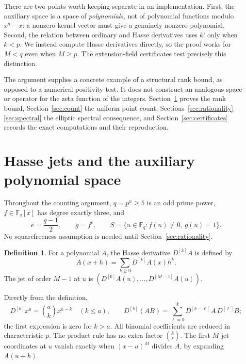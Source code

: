 \documentclass[11pt]{amsart}
\theoremstyle{definition}
\newtheorem{definition}[theorem]{Definition}
\theoremstyle{remark}
\newcommand{\F}{\mathbb F}
\newcommand{\HD}[1]{D^{[#1]}}
\begin{document}
There are two points worth keeping separate in an implementation. First, the auxiliary space is a space of \emph{polynomials}, not of polynomial functions modulo $x^q-x$: a nonzero kernel vector must give a genuinely nonzero polynomial. Second, the relation between ordinary and Hasse derivatives uses $k!$ only when $k<p$. We instead compute Hasse derivatives directly, so the proof works for $M<q$ even when $M\ge p$. The extension-field certificates test precisely this distinction.

The argument supplies a concrete example of a structural rank bound, as opposed to a numerical positivity test. It does not construct an analogous space or operator for the zeta function of the integers. Section~\ref{sec:jets} proves the rank bound, Section~\ref{sec:count} the uniform point count, Sections~\ref{sec:rationality}--\ref{sec:spectral} the elliptic spectral consequence, and Section~\ref{sec:certificates} records the exact computations and their reproduction.

\section{Hasse jets and the auxiliary polynomial space}\label{sec:jets}

Throughout the counting argument, $q=p^n\ge5$ is an odd prime power, $f\in\F_q[x]$ has degree exactly three, and
\[
e=\frac{q-1}{2},\qquad g=f^e,\qquad
S=\{u\in\F_q:f(u)\ne0,\ g(u)=1\}.
\]
No squarefreeness assumption is needed until Section~\ref{sec:rationality}.

\begin{definition}
For a polynomial $A$, the Hasse derivative $\HD{k}A$ is defined by
\[
A(x+h)=\sum_{k\ge0}\HD{k}A(x)h^k.
\]
The jet of order $M-1$ at $u$ is $(\HD{0}A(u),\ldots,\HD{M-1}A(u))$.
\end{definition}
Directly from the definition,
\[
\HD{k}x^a=\binom ak x^{a-k}\quad(k\le a),\qquad
\HD{k}(AB)=\sum_{\ell=0}^k\HD{k-\ell}A\,\HD{\ell}B;
\]
the first expression is zero for $k>a$. All binomial coefficients are reduced in characteristic $p$. The product rule has no extra factor $\binom k\ell$. The first $M$ jet coordinates at $u$ vanish exactly when $(x-u)^M$ divides $A$, by expanding $A(u+h)$.
\end{document}
